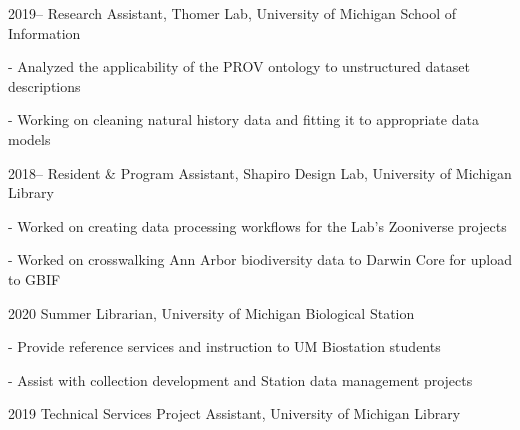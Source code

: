 \documentclass[12pt,letterpaper]{report}
\newcommand{\listitemspace}{0.25em}
\renewenvironment{itemize}
{\begin{list}{}{\setlength{\leftmargin}{0em}
            \setlength{\parskip}{0em}
            \setlength{\itemsep}{\listitemspace}
            \setlength{\parsep}{\listitemspace}}}
{\end{list}}
\begin{document}
\begin{tablist}
    
	\item[2019--] \tab Research Assistant, Thomer Lab, University of Michigan School of Information

	\begin{itemize} \begin{footnotesize}

		\item - Analyzed the applicability of the PROV ontology to unstructured dataset descriptions

		\item - Working on cleaning natural history data and fitting it to appropriate data models

	\end{footnotesize} \end{itemize}
        
	\item[2018--] \tab Resident \& Program Assistant, Shapiro Design Lab, University of Michigan Library

	\begin{itemize} \begin{footnotesize}

		\item - Worked on creating data processing workflows for the Lab’s Zooniverse projects 

		\item - Worked on crosswalking Ann Arbor biodiversity data to Darwin Core for upload to GBIF

	\end{footnotesize} \end{itemize}

	\item[2020] \tab Summer Librarian, University of Michigan Biological Station

	\begin{itemize} \begin{footnotesize}

		\item - Provide reference services and instruction to UM Biostation students

		\item - Assist with collection development and Station data management projects

	\end{footnotesize} \end{itemize}
    
	\item[2019] \tab Technical Services Project Assistant, University of Michigan Library


\end{tablist}
\end{document}
